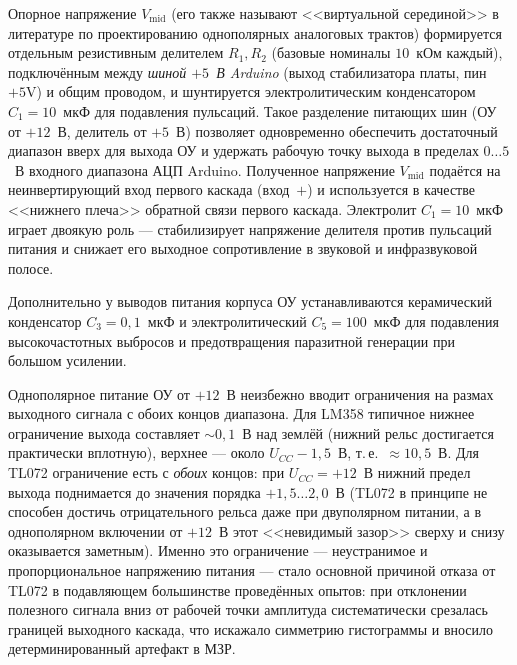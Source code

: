 Опорное напряжение $V_\mathrm{mid}$ (его также называют <<виртуальной серединой>>
в литературе по проектированию однополярных аналоговых трактов) формируется
отдельным резистивным делителем $R_1,R_2$ (базовые номиналы $10$~кОм каждый),
подключённым между \emph{шиной $+5$~В Arduino} (выход стабилизатора платы, пин
$\text{+5V}$) и общим проводом, и шунтируется электролитическим конденсатором
$C_1=10$~мкФ для подавления пульсаций. Такое разделение питающих шин (ОУ от
$+12$~В, делитель от $+5$~В) позволяет одновременно обеспечить достаточный
диапазон вверх для выхода ОУ и удержать рабочую точку выхода в пределах
$0\ldots 5$~В входного диапазона АЦП Arduino. Полученное напряжение $V_\mathrm{mid}$
подаётся на неинвертирующий вход первого каскада (вход~$+$) и используется в
качестве <<нижнего плеча>> обратной связи первого каскада. Электролит
$C_1=10$~мкФ играет двоякую роль --- стабилизирует напряжение делителя против
пульсаций питания и снижает его выходное сопротивление в звуковой и
инфразвуковой полосе.

Дополнительно у выводов питания корпуса ОУ устанавливаются керамический
конденсатор $C_3=0{,}1$~мкФ и электролитический $C_5=100$~мкФ для подавления
высокочастотных выбросов и предотвращения паразитной генерации при большом
усилении.


Однополярное питание ОУ от $+12$~В неизбежно вводит ограничения на размах
выходного сигнала с обоих концов диапазона. Для LM358 типичное нижнее ограничение
выхода составляет $\sim 0{,}1$~В над землёй (нижний рельс достигается практически
вплотную), верхнее --- около $U_{CC}-1{,}5$~В, т.\,е.\ ${\approx}10{,}5$~В. Для
TL072 ограничение есть с \emph{обоих} концов: при $U_{CC}=+12$~В нижний предел
выхода поднимается до значения порядка $+1{,}5\ldots 2{,}0$~В (TL072 в принципе
не способен достичь отрицательного рельса даже при двуполярном питании, а в
однополярном включении от $+12$~В этот <<невидимый зазор>> сверху и снизу
оказывается заметным). Именно это ограничение --- неустранимое и пропорциональное
напряжению питания --- стало основной причиной отказа от TL072 в подавляющем
большинстве проведённых опытов: при отклонении полезного сигнала вниз от
рабочей точки амплитуда систематически срезалась границей выходного каскада,
что искажало симметрию гистограммы и вносило детерминированный артефакт в МЗР.


